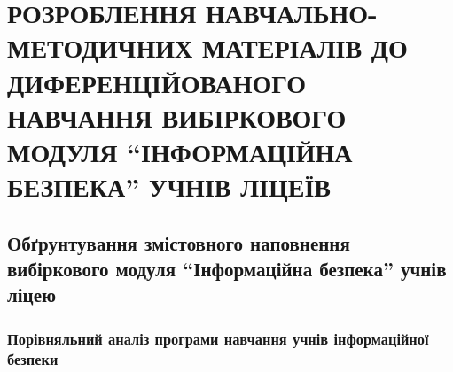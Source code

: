 \clearpage

\section{\MakeUppercase{РОЗРОБЛЕННЯ НАВЧАЛЬНО-МЕТОДИЧНИХ МАТЕРІАЛІВ ДО ДИФЕРЕНЦІЙОВАНОГО НАВЧАННЯ ВИБІРКОВОГО МОДУЛЯ ``ІНФОРМАЦІЙНА БЕЗПЕКА'' УЧНІВ ЛІЦЕЇВ}}

\subsection{Обґрунтування змістовного наповнення вибіркового модуля ``Інформаційна безпека'' учнів ліцею}




\subsubsection{Порівняльний аналіз програми навчання учнів інформаційної безпеки}



